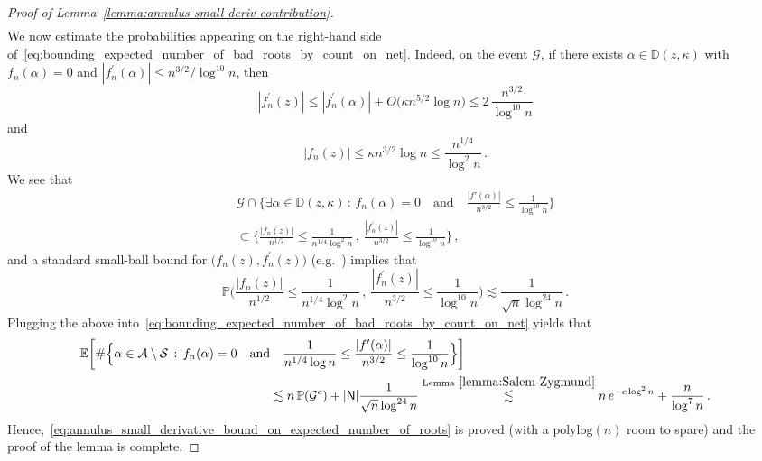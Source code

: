 \documentclass[11pt]{amsart}
\theoremstyle{remark}
\theoremstyle{definition}
\newcommand{\bD}{\mathbb D}
\newcommand{\bP}{\mathbb P}
\newcommand{\bE}{\mathbb E}
\newcommand{\cG}{\mathcal G}
\newcommand{\polylog}{\mathrm{polylog}}
\begin{document}
\begin{proof}[Proof of Lemma~\ref{lemma:annulus-small-deriv-contribution}]
\begin{multline}
    \end{multline}
    We now estimate the probabilities appearing on the right-hand side of~\eqref{eq:bounding_expected_number_of_bad_roots_by_count_on_net}. Indeed, on the event $\cG$, if there exists $\alpha\in \bD(z,\kappa)$ with $f_n(\alpha)=0$ and $|f_n^\prime(\alpha)| \le n^{3/2}/\log^{10}n$, then
    \[
    |f_n^\prime(z)| \le |f_n^\prime(\alpha)| + O\big(\kappa n^{5/2} \log n \big) \le 2 \,  \frac{n^{3/2}}{\log^{10}n}
    \]
    and 
    \[
    |f_n(z)| \le \kappa n^{3/2} \log n \le  \frac{n^{1/4}}{\log^2 n} \, . 
    \]
    We see that
    \begin{multline*}
        \cG \cap \Big\{ \exists \alpha\in \bD(z,\kappa) \, : \, f_n(\alpha) = 0 \quad \text{and} \quad \frac{|f'(\alpha)|}{n^{3/2}} \leq \frac{1}{\log^{10} n} \Big\} \\ \subset \Big\{ \frac{|f_n(z)|}{n^{1/2}} \le \frac{1}{n^{1/4} \log^2 n} \, , \ \frac{|f_n^\prime(z)|}{n^{3/2}} \le \frac{1}{\log^{10}n}\Big\} \, ,
    \end{multline*}
    and a standard small-ball bound for $\big(f_n(z),f_n^\prime(z)\big)$ (e.g.~\cite[Claim~3.5]{Michelen-Yakir-root-separation}) implies that 
    \[
    \bP\bigg( \frac{|f_n(z)|}{n^{1/2}} \le \frac{1}{n^{1/4} \log^2 n} \, , \ \frac{|f_n^\prime(z)|}{n^{3/2}} \le \frac{1}{\log^{10}n}  \bigg) \lesssim  \frac{1}{\sqrt{n} \log^{24}n} \, .
    \]
    Plugging the above into~\eqref{eq:bounding_expected_number_of_bad_roots_by_count_on_net} yields that
    \begin{align*}
     \bE \bigg[ \# \Big\{\alpha\in \mathcal{A} \setminus \mathcal{S} \, : \, f_n(\alpha) = 0 \quad \text{and} & \quad \frac{1}{n^{1/4}\log n} \le \frac{|f'(\alpha)|}{n^{3/2}} \leq \frac{1}{\log^{10} n} \Big\} \bigg]  \\ &\lesssim  n \, \bP(\cG^c) + |{\sf N}| \frac{1}{\sqrt{n} \log^{24}n} \stackrel{\text{Lemma}~\ref{lemma:Salem-Zygmund}}{\lesssim} n \, e^{-c\log^2 n} + \frac{n}{\log^{7}n}  \, .  
    \end{align*}
     Hence,~\eqref{eq:annulus_small_derivative_bound_on_expected_number_of_roots} is proved (with a $\polylog(n)$ room to spare) and the proof of the lemma is complete. 
    \end{proof}
\end{document}
